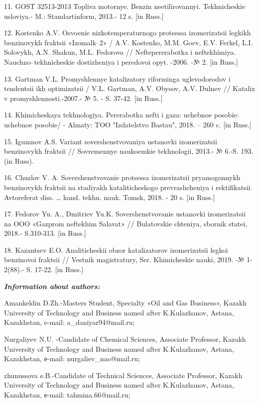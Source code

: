 11. GOST 32513-2013 Topliva motornye. Benzin neetilirovannyi.
Tekhnicheskie usloviya.- M.: Standartinform, 2013.- 12 s. {[}in Russ.{]}

12. Kostenko A.V. Osvoenie nizkotemperaturnogo protsessa izomerizatsii
legkikh benzinovykh fraktsii «Izomalk--2» / A.V. Kostenko, M.M. Goev,
E.V. Ferkel\textquotesingle, L.I. Solovykh, A.N. Shakun, M.L. Fedorova
// Neftepererabotka i neftekhimiya. Nauchno--tekhnicheskie dostizheniya
i peredovoi opyt. -2006. -№ 2. {[}in Russ.{]}

13. Gartman V.L. Promyshlennye katalizatory riforminga uglevodorodov i
tendentsii ikh optimizatsii / V.L. Gartman, A.V. Obysov, A.V.
Dul\textquotesingle nev // Kataliz v promyshlennosti.-2007.- № 5. - S.
37-42. {[}in Russ.{]}

14. Khimicheskaya tekhnologiya. Pererabotka nefti i gaza: uchebnoe
posobie: uchebnoe posobie/ - Almaty: TOO "Izdatel\textquotesingle stvo
Bastau", 2018. -- 260 c. {[}in Russ.{]}

15. Igumnov A.S. Variant sovershenstvovaniya ustanovki izomerizatsii
benzinovykh fraktsii // Sovremennye naukoemkie tekhnologii, 2013.- №
6.-S. 193. (in Russ).

16. Chuzlov V. A. Sovershenstvovanie protsessa izomerizatsii
pryamogonnykh benzinovykh fraktsii na stadiyakh kataliticheskogo
prevrashcheniya i rektifikatsii. Avtoreferat diss. \ldots{} kand. tekhn.
nauk. Tomsk, 2018. - 20 s. {[}in Russ.{]}

17. Fedorov Yu. A., Dmitriev Yu.K. Sovershenstvovanie ustanovki
izomerizatsii na OOO «Gazprom neftekhim Salavat» // Bulatovskie
chteniya, sbornik statei, 2018.- S.310-313. {[}in Russ.{]}

18. Kazantsev E.O. Analiticheskii obzor katalizatorov izomerizatsii
legkoi benzinovoi fraktsii // Vestnik magistratury, Ser. Khimicheskie
nauki, 2019. -№ 1-2(88).- S. 17-22. {[}in Russ.{]}

\emph{\textbf{Information about authors:}}

Amankeldin D.Zh.-Master\textquotesingle s Student, Specialty «Oil and
Gas Business», Kazakh University of Technology and Business named after
K.Kulazhanov, Astana, Kazakhstan, e-mail: a\_daniyar94@mail.ru;

Nurgaliyev N.U. -Candidate of Chemical Sciences, Associate Professor,
Kazakh University of Technology and Business named after K.Kulazhanov,
Astana, Kazakhstan, е-mail: nurgaliev\_nao@mail.ru;

zhunussova e.B.-Candidate of Technical Sciences, Associate Professor,
Kazakh University of Technology and Business named after K.Kulazhanov,
Astana, Kazakhstan, е-mail: tahmina.66@mail.ru;

